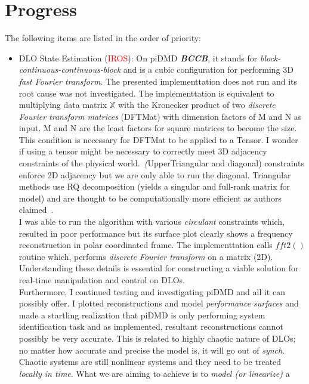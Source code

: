 \documentclass[11pt]{article}
\begin{document}
\section{Progress}
The following items are listed in the order of priority:
\begin{itemize}
    \item DLO State Estimation (\textcolor{red}{IROS}):
    On piDMD \emph{\textbf{BCCB}}, it stands for
    \emph{block-continuous-continuous-block} and is a cubic configuration for
    performing 3D \emph{fast Fourier transform}. The presented implementtation
    does not run and its root cause was not investigated. The implementtation is
    equivalent to multiplying data matrix \(\mathbb{X}\) with the Kronecker
    product of two \emph{discrete Fourier transform matrices} (DFTMat) with dimension
    factors of M and N as input. M and N are the least factors for square
    matrices to become the size. This condition is necessary for DFTMat to be
    applied to a Tensor. I wonder if using a tensor might be necessary to
    correctly meet 3D adjacency constraints of the physical world.\
    \emph(UpperTriangular and diagonal) constraints enforce 2D adjacency
    but we are only able to run the diagonal. Triangular methods use RQ
    decomposition (yields a singular and full-rank matrix for model) and are
    thought to be computationally more efficient as
    authors claimed~\cite{baddoo2021physics}.\\
    I was able to run the algorithm with various \emph{circulant} constraints
    which, resulted in poor performance but its surface plot clearly shows a
    frequency reconstruction in polar coordinated frame. The implementtation
    calls \(fft2()\) routine which, performs \emph{discrete Fourier transform}
    on a matrix (2D). Understanding these details is essential for constructing
    a viable solution for real-time manipulation and control on DLOs.\\
    Furthermore, I continued testing and investigating piDMD and all it can
    possibly offer. I plotted reconstructions and model
    \emph{performance surfaces} and made a startling realization that piDMD is
    only performing system identification task and as implemented, resultant
    reconstructions cannot possibly be very accurate. This is related to
    highly chaotic nature of DLOs; no matter how accurate and precise the model
    is, it will go out of \emph{synch}. Chaotic systems are still nonlinear
    systems and they need to be treated \emph{locally in time}. What we are
    aiming to achieve is to \emph{model (or linearize)} a

\end{itemize}
\end{document}

